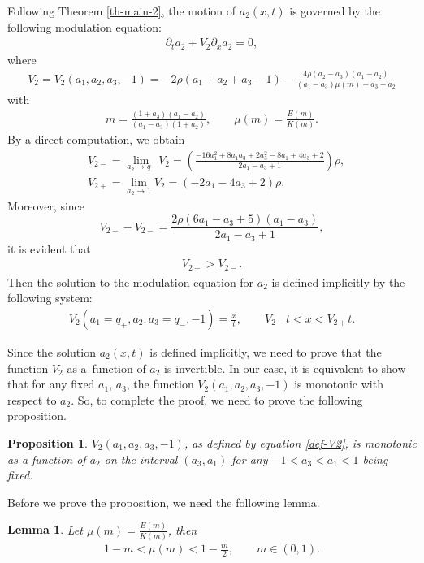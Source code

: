 \documentclass[10pt,a4paper]{amsart}
\numberwithin{equation}{section}
\newtheorem{Lemma}[Theorem]{Lemma}
\newtheorem{Proposition}[Theorem]{Proposition}
\def\ra{\rightarrow}
\begin{document}
Following Theorem \ref{th-main-2}, the motion of $a_2(x,t)$ is governed by the following modulation equation:
\begin{align*}
\partial_t a_2+V_2\partial_x a_2=0,
\end{align*}
where
\begin{align}
V_2 =V_2(a_1,a_2,a_3,-1)=-2\rho(a_1+a_2+a_3-1)-\frac{4\rho(a_2-a_3)(a_1-a_2)}{(a_1-a_3)\mu(m) +a_3-a_2}\label{def-V2}
\end{align}
with
\begin{align*}
m=\frac{(1+a_3)(a_1-a_2)}{(a_1-a_3)(1+a_2)},\qquad
\mu(m)=\frac{E(m)}{K(m)}.
\end{align*}
By a direct computation, we obtain
\begin{align*}
&V_{2-}=\lim_{a_2\ra q_-}V_2=\left(\frac{-16a_1^2+8a_1a_3+2a_3^2-8a_1+4a_3+2}{2a_1-a_3+1}\right)\rho,\\
&V_{2+}=\lim_{a_2\ra 1}V_2=(-2a_1-4a_3+2)\rho.
\end{align*}
Moreover, since \[V_{2+}-V_{2-}=\frac{2\rho(6a_1-a_3+5)(a_1-a_3)}{2a_1-a_3+1},\] it is evident that
\begin{align*}
V_{2+}>V_{2-}.
\end{align*}
Then the solution to the modulation equation for $a_2$ is defined implicitly by the following system:
\begin{align}
V_2(a_1=q_+,a_2,a_3=q_-,-1)=\frac{x}{t},\qquad V_{2-}t<x<V_{2+}t.\label{eq: implic-a2}
\end{align}

Since the solution $a_2(x,t)$ is defined implicitly, we need to prove that the function $V_2$ as a~function of $a_2$ is invertible. In our case, it is equivalent to show that for any fixed $a_1$, $a_3$, the function $V_2(a_1,a_2,a_3,-1)$ is monotonic with respect to $a_2$. So, to complete the proof, we need to prove the following proposition.

\begin{Proposition}\label{mono-V2}
$V_2(a_1,a_2,a_3,-1)$, as defined by equation \eqref{def-V2}, is monotonic as a function of $a_2$ on the interval $(a_3,a_1)$ for any $-1<a_3<a_1<1$ being fixed.
\end{Proposition}

Before we prove the proposition, we need the following lemma.
\begin{Lemma}\label{Lemma-mu-ineq}
Let $\mu(m)=\frac{E(m)}{K(m)}$, then
\begin{align}\label{mu-ineq}
1-m<\mu(m)<1-\frac{m}{2},\qquad m\in (0,1).
\end{align}
\end{Lemma}
\end{document}
